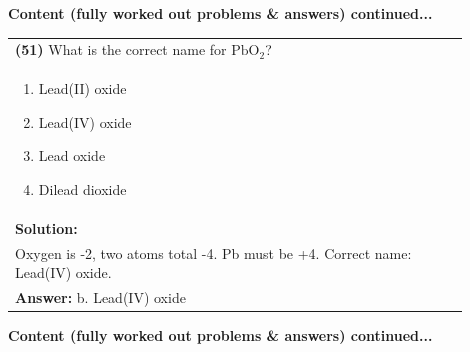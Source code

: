 \documentclass{article}
\begin{document}
\newpage
\noindent
{\large\textbf{Content (fully worked out problems \& answers) continued...}}\\[0.2em]

\begin{tabular}{|p{0.9\linewidth}|}
\hline
\vspace{0.2cm}
\textbf{(51)} What is the correct name for $\text{PbO}_2$? \\
\begin{minipage}[t]{0.85\linewidth}
\begin{enumerate}[label=\alph*.]
\item Lead(II) oxide \
\item Lead(IV) oxide \
\item Lead oxide \
\item Dilead dioxide
\end{enumerate}
\end{minipage}\\
\hline
\vspace{0.2cm}
\textbf{Solution:} \\
Oxygen is -2, two atoms total -4. Pb must be +4. Correct name: Lead(IV) oxide. \\
\hline
\vspace{0.2cm}
\textbf{Answer:} b. Lead(IV) oxide \
\hline
\end{tabular}

\newpage
\noindent
{\large\textbf{Content (fully worked out problems \& answers) continued...}}\\[0.2em]
\end{document}
